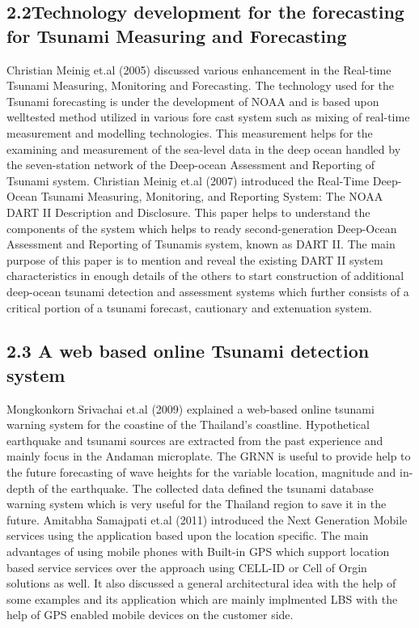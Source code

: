 \subsection{2.2Technology development for the forecasting for Tsunami Measuring and Forecasting}
Christian Meinig et.al (2005) discussed various enhancement in the Real-time Tsunami Measuring, Monitoring and Forecasting.  The technology used for the Tsunami forecasting is under the development of NOAA and is based upon welltested method utilized in various fore cast system  such as mixing of real-time measurement and modelling technologies.  This measurement helps for the examining and measurement of the sea-level data in the deep ocean handled by the seven-station network of the Deep-ocean Assessment and Reporting of Tsunami system.
Christian Meinig et.al (2007) introduced the Real-Time Deep-Ocean Tsunami Measuring, Monitoring, and Reporting System: The NOAA DART II Description and Disclosure. This paper helps to understand the components of the system which helps to ready second-generation Deep-Ocean Assessment and Reporting of Tsunamis system, known as DART II. The main purpose of this paper is to mention and reveal the existing DART II system characteristics in enough details of the others to start construction of additional deep-ocean tsunami detection and assessment systems which further consists of a critical portion of a tsunami forecast, cautionary and extenuation system.
\subsection{2.3 A web based online Tsunami detection system}
Mongkonkorn Srivachai et.al (2009) explained a web-based online tsunami warning system for the coastine of the Thailand’s coastline. Hypothetical earthquake and tsunami sources are extracted from the past experience and mainly focus in the Andaman microplate. The GRNN is useful to provide help to the future forecasting of wave heights for the variable location, magnitude and in-depth of the earthquake. The collected data defined the tsunami database warning system which is very useful for the Thailand region to save it in the future.
Amitabha Samajpati et.al (2011) introduced the Next Generation Mobile services using the application based upon the location specific.  The main advantages of using mobile phones with Built-in GPS which support location based service services over the approach using CELL-ID or Cell of Orgin solutions as well. It also discussed  a general architectural idea with the help of some examples and its application which are mainly implmented LBS  with the help of GPS enabled mobile devices on the customer side.
